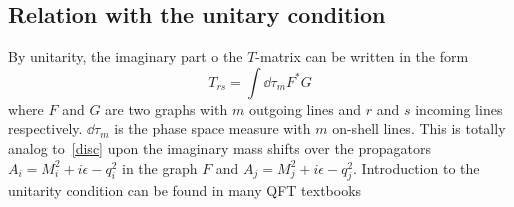 \subsection*{Relation with the unitary condition}
By unitarity, the imaginary part o the $T$-matrix can be written in the form
\begin{equation*}
T_{rs} = \int\dd\tau_m F^* G
\end{equation*}
where $F$ and $G$ are two graphs with $m$ outgoing lines and $r$ and $s$ incoming lines respectively.
$\dd \tau_m$ is the phase space measure with $m$ on-shell lines.
This is totally analog to~\cref{disc} upon the imaginary mass shifts over the propagators $A_i =M_i^2 +i\epsilon - q_i^2$ in the graph $F$ and $A_j =M_j^2 +i\epsilon - q_j^2$. 
Introduction to the unitarity condition can be found in many QFT textbooks \eg\cite{Schwartz:2013pla} 
